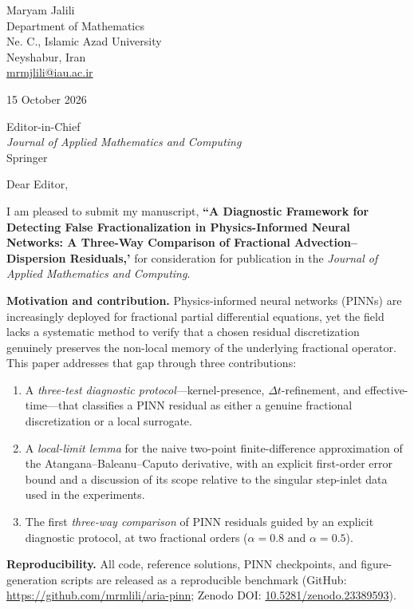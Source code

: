 \documentclass[11pt,a4paper]{article}
\begin{document}
Maryam Jalili \\
Department of Mathematics \\
Ne. C., Islamic Azad University \\
Neyshabur, Iran \\
\href{mailto:mrmjlili@iau.ac.ir}{mrmjlili@iau.ac.ir}

15 October 2026

Editor-in-Chief \\
\emph{Journal of Applied Mathematics and Computing} \\
Springer

Dear Editor,

I am pleased to submit my manuscript, \textbf{``A Diagnostic Framework for Detecting False Fractionalization in Physics-Informed Neural Networks: A Three-Way Comparison of Fractional Advection--Dispersion Residuals,'} for consideration for publication in the \emph{Journal of Applied Mathematics and Computing}.

\textbf{Motivation and contribution.} Physics-informed neural networks (PINNs) are increasingly deployed for fractional partial differential equations, yet the field lacks a systematic method to verify that a chosen residual discretization genuinely preserves the non-local memory of the underlying fractional operator. This paper addresses that gap through three contributions:

\begin{enumerate}
\item A \emph{three-test diagnostic protocol}---kernel-presence, $\Delta t$-refinement, and effective-time---that classifies a PINN residual as either a genuine fractional discretization or a local surrogate.
\item A \emph{local-limit lemma} for the naive two-point finite-difference approximation of the Atangana--Baleanu--Caputo derivative, with an explicit first-order error bound and a discussion of its scope relative to the singular step-inlet data used in the experiments.
\item The first \emph{three-way comparison} of PINN residuals guided by an explicit diagnostic protocol, at two fractional orders ($\alpha = 0.8$ and $\alpha = 0.5$).
\end{enumerate}

\textbf{Reproducibility.} All code, reference solutions, PINN checkpoints, and figure-generation scripts are released as a reproducible benchmark (GitHub: \url{https://github.com/mrmlili/aria-pinn}; Zenodo DOI: \href{https://doi.org/10.5281/zenodo.23389593}{10.5281/zenodo.23389593}).
\end{document}
